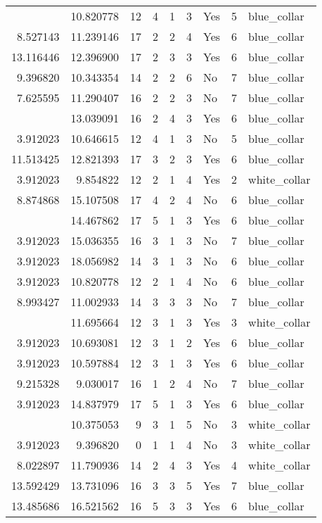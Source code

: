 \documentclass[
]{article}
\begin{document}
\begin{longtable}[t]{rrrrrllrl}
\addlinespace
3.912023 & 10.820778 & 12 & 4 & 1 & 3 & Yes & 5 & blue\_collar\\
8.527143 & 11.239146 & 17 & 2 & 2 & 4 & Yes & 6 & blue\_collar\\
13.116446 & 12.396900 & 17 & 2 & 3 & 3 & Yes & 6 & blue\_collar\\
9.396820 & 10.343354 & 14 & 2 & 2 & 6 & No & 7 & blue\_collar\\
7.625595 & 11.290407 & 16 & 2 & 2 & 3 & No & 7 & blue\_collar\\
\addlinespace
11.918724 & 13.039091 & 16 & 2 & 4 & 3 & Yes & 6 & blue\_collar\\
3.912023 & 10.646615 & 12 & 4 & 1 & 3 & No & 5 & blue\_collar\\
11.513425 & 12.821393 & 17 & 3 & 2 & 3 & Yes & 6 & blue\_collar\\
3.912023 & 9.854822 & 12 & 2 & 1 & 4 & Yes & 2 & white\_collar\\
8.874868 & 15.107508 & 17 & 4 & 2 & 4 & No & 6 & blue\_collar\\
\addlinespace
3.912023 & 14.467862 & 17 & 5 & 1 & 3 & Yes & 6 & blue\_collar\\
3.912023 & 15.036355 & 16 & 3 & 1 & 3 & No & 7 & blue\_collar\\
3.912023 & 18.056982 & 14 & 3 & 1 & 3 & No & 6 & blue\_collar\\
3.912023 & 10.820778 & 12 & 2 & 1 & 4 & No & 6 & blue\_collar\\
8.993427 & 11.002933 & 14 & 3 & 3 & 3 & No & 7 & blue\_collar\\
\addlinespace
3.912023 & 11.695664 & 12 & 3 & 1 & 3 & Yes & 3 & white\_collar\\
3.912023 & 10.693081 & 12 & 3 & 1 & 2 & Yes & 6 & blue\_collar\\
3.912023 & 10.597884 & 12 & 3 & 1 & 3 & Yes & 6 & blue\_collar\\
9.215328 & 9.030017 & 16 & 1 & 2 & 4 & No & 7 & blue\_collar\\
3.912023 & 14.837979 & 17 & 5 & 1 & 3 & Yes & 6 & blue\_collar\\
\addlinespace
3.912023 & 10.375053 & 9 & 3 & 1 & 5 & No & 3 & white\_collar\\
3.912023 & 9.396820 & 0 & 1 & 1 & 4 & No & 3 & white\_collar\\
8.022897 & 11.790936 & 14 & 2 & 4 & 3 & Yes & 4 & white\_collar\\
13.592429 & 13.731096 & 16 & 3 & 3 & 5 & Yes & 7 & blue\_collar\\
13.485686 & 16.521562 & 16 & 5 & 3 & 3 & Yes & 6 & blue\_collar\\

\end{longtable}
\end{document}
